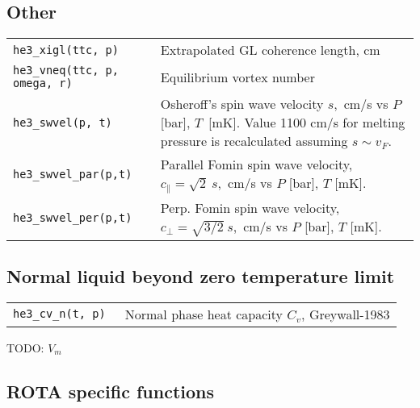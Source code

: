 \documentclass[a4paper]{article}
\begin{document}
\eject

\subsection*{Other}

\medskip
\noindent\begin{tabular}{lp{11cm}}
\tt he3\_xigl(ttc, p) & Extrapolated GL coherence length, cm\\
\tt he3\_vneq(ttc, p, omega, r) & Equilibrium vortex number\\

\tt he3\_swvel(p, t) & Osheroff's spin wave velocity $s$,~cm/s
                      vs $P$ [bar], $T$~[mK]. Value 1100 cm/s for
                      melting pressure is recalculated assuming $s\sim v_F$.\\
\tt he3\_swvel\_par(p,t) & Parallel Fomin spin wave velocity,\newline
                          $c_\parallel = \sqrt{2}\ s$,~cm/s vs $P$ [bar], $T$ [mK].\\
\tt he3\_swvel\_per(p,t) & Perp. Fomin spin wave velocity,\newline
                          $c_\perp = \sqrt{3/2}\ s$,~cm/s vs $P$ [bar], $T$ [mK].\\

\end{tabular}
\medskip

\subsection*{Normal liquid beyond zero temperature limit}

\medskip
\noindent\begin{tabular}{lp{11cm}}
\tt he3\_cv\_n(t, p)  &Normal phase heat capacity $C_v$, {\small Greywall-1983}\\

\end{tabular}
\medskip

TODO: $V_m$

\subsection*{ROTA specific functions}
\end{document}
